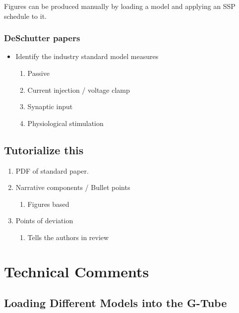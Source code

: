 \documentclass[12pt]{article}
\begin{document}
Figures can be produced manually by loading a model and applying an
SSP schedule to it.



\subsubsection{DeSchutter papers}
\begin{itemize}
\item Identify the industry standard model measures
  \begin{enumerate}
  \item Passive
  \item Current injection / voltage clamp
  \item Synaptic input
  \item Physiological stimulation
  \end{enumerate}
\end{itemize}

\subsection{Tutorialize this}

\begin{enumerate}
\item PDF of standard paper.
\item Narrative components / Bullet points
  \begin{enumerate}
  \item Figures based
  \end{enumerate}
\item Points of deviation
  \begin{enumerate}
  \item Tells the authors in review
  \end{enumerate}
\end{enumerate}


\section{Technical Comments}

\subsection{Loading Different Models into the G-Tube}
\end{document}
